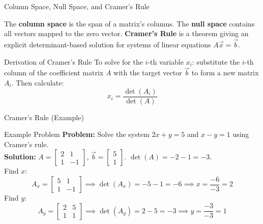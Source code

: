 \documentclass[10pt, aspectratio=169]{beamer}
\begin{document}
\begin{frame}{Column Space, Null Space, and Cramer's Rule}
    \begin{definition}
        The \textbf{column space} is the span of a matrix's columns. The \textbf{null space} contains all vectors mapped to the zero vector. \textbf{Cramer's Rule} is a theorem giving an explicit determinant-based solution for systems of linear equations $A\vec{x} = \vec{b}$.
    \end{definition}

    \begin{block}{Derivation of Cramer's Rule}
        To solve for the $i$-th variable $x_i$: substitute the $i$-th column of the coefficient matrix $A$ with the target vector $\vec{b}$ to form a new matrix $A_i$. 
        Then calculate: $$x_i = \frac{\det(A_i)}{\det(A)}$$
    \end{block}
\end{frame}

\begin{frame}{Cramer's Rule (Example)}
    \begin{exampleblock}{Example Problem}
        \textbf{Problem:} Solve the system $2x + y = 5$ and $x - y = 1$ using Cramer's rule. \\
        \vspace{0.2cm}
        \textbf{Solution:} 
        $A = \begin{bmatrix} 2 & 1 \\ 1 & -1 \end{bmatrix}$, $\vec{b} = \begin{bmatrix} 5 \\ 1 \end{bmatrix}$. $\det(A) = -2 - 1 = -3$. \\
        \vspace{0.2cm}
        Find $x$:
        $$A_x = \begin{bmatrix} 5 & 1 \\ 1 & -1 \end{bmatrix} \implies \det(A_x) = -5 - 1 = -6 \implies x = \frac{-6}{-3} = 2$$
        Find $y$:
        $$A_y = \begin{bmatrix} 2 & 5 \\ 1 & 1 \end{bmatrix} \implies \det(A_y) = 2 - 5 = -3 \implies y = \frac{-3}{-3} = 1$$
    \end{exampleblock}
\end{frame}

\end{document}
